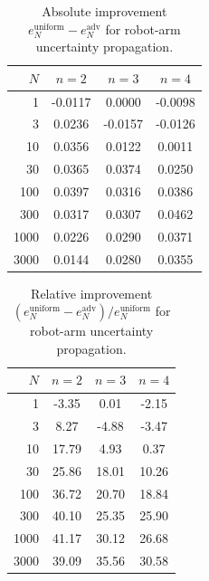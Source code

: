 \begin{table}[t]
\centering
\caption{Absolute improvement $e_N^{\mathrm{uniform}} - e_N^{\mathrm{adv}}$ for robot-arm uncertainty propagation.}
\label{tab:robotarm-adv-absolute-improvement}
\begin{tabular}{rccc}
\toprule
$N$ & $n=2$ & $n=3$ & $n=4$ \\
\midrule
1 & -0.0117 & 0.0000 & -0.0098 \\
3 & 0.0236 & -0.0157 & -0.0126 \\
10 & 0.0356 & 0.0122 & 0.0011 \\
30 & 0.0365 & 0.0374 & 0.0250 \\
100 & 0.0397 & 0.0316 & 0.0386 \\
300 & 0.0317 & 0.0307 & 0.0462 \\
1000 & 0.0226 & 0.0290 & 0.0371 \\
3000 & 0.0144 & 0.0280 & 0.0355 \\
\bottomrule
\end{tabular}
\end{table}

\begin{table}[t]
\centering
\caption{Relative improvement $(e_N^{\mathrm{uniform}} - e_N^{\mathrm{adv}})/e_N^{\mathrm{uniform}}$ for robot-arm uncertainty propagation.}
\label{tab:robotarm-adv-relative-improvement}
\begin{tabular}{rccc}
\toprule
$N$ & $n=2$ & $n=3$ & $n=4$ \\
\midrule
1 & -3.35 & 0.01 & -2.15 \\
3 & 8.27 & -4.88 & -3.47 \\
10 & 17.79 & 4.93 & 0.37 \\
30 & 25.86 & 18.01 & 10.26 \\
100 & 36.72 & 20.70 & 18.84 \\
300 & 40.10 & 25.35 & 25.90 \\
1000 & 41.17 & 30.12 & 26.68 \\
3000 & 39.09 & 35.56 & 30.58 \\
\bottomrule
\end{tabular}
\end{table}

